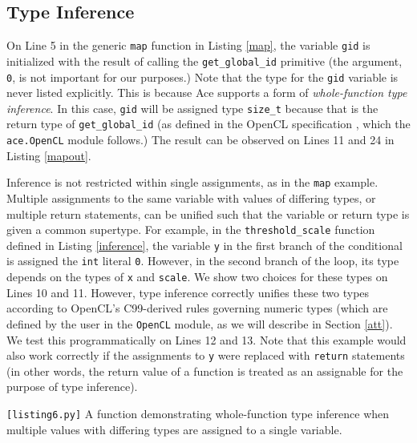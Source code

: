 \documentclass{sig-alternate}
\begin{document}
\subsection{Type Inference}
On Line 5 in the generic \verb|map| function in Listing \ref{map}, the variable \verb|gid| is initialized with the result of calling the \verb|get_global_id| primitive (the argument, \verb|0|, is not important for our purposes.)  Note that the type for the \verb|gid| variable is never listed explicitly. This is because Ace supports a form of {\em whole-function type inference}. In this case, \verb|gid| will be assigned type \verb|size_t| because that is the return type of \verb|get_global_id| (as defined in the OpenCL specification \cite{opencl}, which the \verb|ace.OpenCL| module follows.) The result can be observed on Lines 11 and 24 in Listing \ref{mapout}. 

Inference is not restricted within single assignments, as in the \verb|map| example. Multiple assignments to the same variable with values of differing types, or multiple return statements, can be unified such that the variable or return type is given a common supertype. For example, in the \verb|threshold_scale| function defined in Listing \ref{inference}, the variable \verb|y| in the first branch of the conditional is assigned the \verb|int| literal \verb|0|. However, in the second branch of the loop, its type depends on the types of \verb|x| and \verb|scale|. We show two choices for these types on Lines 10 and 11. However, type inference correctly unifies these two types according to OpenCL's C99-derived rules governing numeric types (which are defined by the user in the \verb|OpenCL| module, as we will describe in Section \ref{att}). We test this programmatically on Lines 12 and 13. Note that this example would also work correctly if the assignments to \verb|y| were replaced with \verb|return| statements (in other words, the return value of a function is treated as an assignable for the purpose of type inference).

\begin{codelisting}

\caption{\texttt{[listing6.py]} A function demonstrating whole-function type inference when multiple values with differing types are assigned to a single variable.}
\label{inference}
\end{codelisting}
\end{document}
